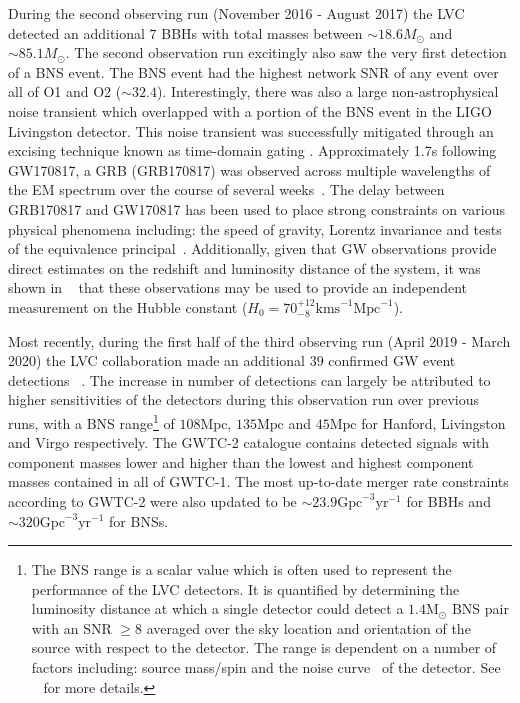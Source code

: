 %
%
During the second observing run (November 2016 - August 2017) the 
\ac{LVC} detected an additional $7$ \ac{BBH}s with total masses between $\sim 18.6 M_\odot$ and $\sim 85.1 M_\odot$. The second observation run excitingly also saw the very first detection of a \ac{BNS} event. The \ac{BNS} event had the highest network \ac{SNR} of any event over all of O1 and O2 ($\sim 32.4$). Interestingly, there was also a large non-astrophysical noise transient which overlapped 
with a portion of the \ac{BNS} event in the \ac{LIGO} Livingston 
detector. This noise transient was successfully mitigated through an 
excising technique known as time-domain gating \cite{PhysRevLett.119.161101}. Approximately 1.7s following GW170817, a \ac{GRB} (GRB170817) was observed 
across multiple wavelengths of the \ac{EM} spectrum over the course of several 
weeks~\cite{2017arXiv171005834L}. The delay between GRB170817 
and GW170817 has been used to place strong constraints on 
various physical phenomena including: the speed of gravity, Lorentz invariance and tests of the equivalence principal~\cite{2017arXiv171005834L}. 
Additionally, given that \ac{GW} 
observations provide direct estimates on the redshift and 
luminosity distance of the 
system, it was shown in ~\cite{Abbott2017} that these observations may be used 
to provide an independent measurement on the Hubble constant 
($H_0 = 70^{+12}_{-8} \mathrm{km s}^{-1} \mathrm{Mpc}^{-1}$).

%
%
Most recently, during the first half of the third observing run 
(April 2019 - March 2020) the \ac{LVC} collaboration made an 
additional $39$ confirmed \ac{GW} event detections~\cite{1811.12907, 2010.14527}
. The increase in number of detections can largely be attributed to higher sensitivities of the detectors during this observation run over previous runs, with a \ac{BNS} range\footnote{The \ac{BNS} range is a scalar value which is often used to represent the performance of the \ac{LVC} detectors. It 
is quantified by determining the luminosity distance at which a single  
detector could detect a $1.4 \mathrm{M}_\odot$ \ac{BNS} pair with an 
\ac{SNR} $\geq 8$ averaged 
over the sky location and orientation of the source with respect 
to the detector. The range is dependent on a number of factors including: 
source mass/spin and the noise curve~\cite{Abbott_2020} of the detector. See ~\cite{2021CQGra..38e5010C,PhysRevD.47.2198} for more details.} of $108 \mathrm{Mpc}$, $135 \mathrm{Mpc}$ and $45 \mathrm{Mpc}$ for Hanford, Livingston and Virgo respectively. The GWTC-2 catalogue contains detected signals 
with component masses lower and higher 
than the lowest and highest component masses contained in all of 
GWTC-1. The most up-to-date merger rate constraints according to GWTC-2 were also updated to be $\sim 23.9 \mathrm{Gpc}^{-3} \mathrm{yr}^{-1}$ for \ac{BBH}s and $\sim 320 \mathrm{Gpc}^{-3} \mathrm{yr}^{-1}$ for \ac{BNS}s. 

